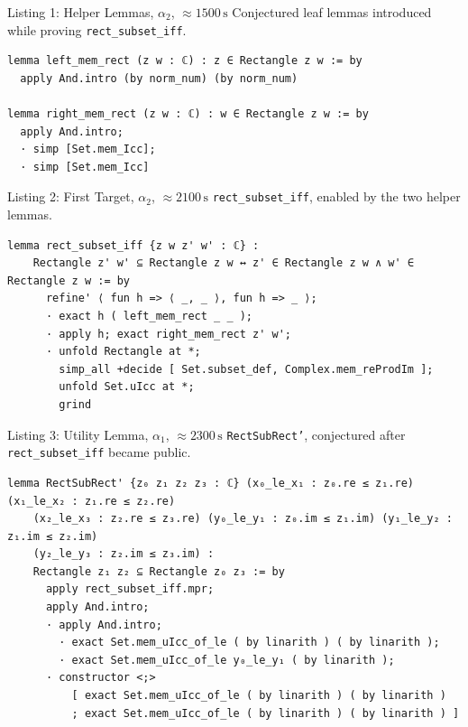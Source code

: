 \documentclass[10pt,aspectratio=169]{beamer}
\begin{document}
\begin{frame}[fragile]{Listing 1: Helper Lemmas, $\alpha_2$, $\approx1500\,\mathrm{s}$}
\scriptsize
Conjectured leaf lemmas introduced while proving \texttt{rect\_subset\_iff}.
\begin{lstlisting}[basicstyle=\ttfamily\tiny]
lemma left_mem_rect (z w : ℂ) : z ∈ Rectangle z w := by
  apply And.intro (by norm_num) (by norm_num)
 
lemma right_mem_rect (z w : ℂ) : w ∈ Rectangle z w := by
  apply And.intro;
  · simp [Set.mem_Icc];
  · simp [Set.mem_Icc]
\end{lstlisting}
\end{frame}

\begin{frame}[fragile]{Listing 2: First Target, $\alpha_2$, $\approx2100\,\mathrm{s}$}
\scriptsize
\texttt{rect\_subset\_iff}, enabled by the two helper lemmas.
\begin{lstlisting}[basicstyle=\ttfamily\tiny]
lemma rect_subset_iff {z w z' w' : ℂ} :
    Rectangle z' w' ⊆ Rectangle z w ↔ z' ∈ Rectangle z w ∧ w' ∈ Rectangle z w := by
      refine' ⟨ fun h => ⟨ _, _ ⟩, fun h => _ ⟩;
      · exact h ( left_mem_rect _ _ );
      · apply h; exact right_mem_rect z' w';
      · unfold Rectangle at *;
        simp_all +decide [ Set.subset_def, Complex.mem_reProdIm ];
        unfold Set.uIcc at *;
        grind
\end{lstlisting}
\end{frame}

\begin{frame}[fragile]{Listing 3: Utility Lemma, $\alpha_1$, $\approx2300\,\mathrm{s}$}
\scriptsize
\texttt{RectSubRect'}, conjectured after \texttt{rect\_subset\_iff} became public.
\begin{lstlisting}[basicstyle=\ttfamily\tiny]
lemma RectSubRect' {z₀ z₁ z₂ z₃ : ℂ} (x₀_le_x₁ : z₀.re ≤ z₁.re) (x₁_le_x₂ : z₁.re ≤ z₂.re)
    (x₂_le_x₃ : z₂.re ≤ z₃.re) (y₀_le_y₁ : z₀.im ≤ z₁.im) (y₁_le_y₂ : z₁.im ≤ z₂.im)
    (y₂_le_y₃ : z₂.im ≤ z₃.im) :
    Rectangle z₁ z₂ ⊆ Rectangle z₀ z₃ := by
      apply rect_subset_iff.mpr;
      apply And.intro;
      · apply And.intro;
        · exact Set.mem_uIcc_of_le ( by linarith ) ( by linarith );
        · exact Set.mem_uIcc_of_le y₀_le_y₁ ( by linarith );
      · constructor <;>
          [ exact Set.mem_uIcc_of_le ( by linarith ) ( by linarith )
          ; exact Set.mem_uIcc_of_le ( by linarith ) ( by linarith ) ]
\end{lstlisting}
\end{frame}
\end{document}
